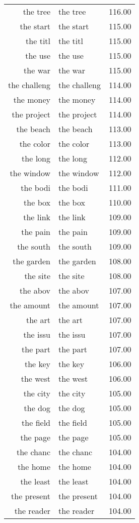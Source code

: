 \begin{table}[ht]
\begin{tabular}{rlr}
  the tree & the tree & 116.00 \\ 
  the start & the start & 115.00 \\ 
  the titl & the titl & 115.00 \\ 
  the use & the use & 115.00 \\ 
  the war & the war & 115.00 \\ 
  the challeng & the challeng & 114.00 \\ 
  the money & the money & 114.00 \\ 
  the project & the project & 114.00 \\ 
  the beach & the beach & 113.00 \\ 
  the color & the color & 113.00 \\ 
  the long & the long & 112.00 \\ 
  the window & the window & 112.00 \\ 
  the bodi & the bodi & 111.00 \\ 
  the box & the box & 110.00 \\ 
  the link & the link & 109.00 \\ 
  the pain & the pain & 109.00 \\ 
  the south & the south & 109.00 \\ 
  the garden & the garden & 108.00 \\ 
  the site & the site & 108.00 \\ 
  the abov & the abov & 107.00 \\ 
  the amount & the amount & 107.00 \\ 
  the art & the art & 107.00 \\ 
  the issu & the issu & 107.00 \\ 
  the part & the part & 107.00 \\ 
  the key & the key & 106.00 \\ 
  the west & the west & 106.00 \\ 
  the city & the city & 105.00 \\ 
  the dog & the dog & 105.00 \\ 
  the field & the field & 105.00 \\ 
  the page & the page & 105.00 \\ 
  the chanc & the chanc & 104.00 \\ 
  the home & the home & 104.00 \\ 
  the least & the least & 104.00 \\ 
  the present & the present & 104.00 \\ 
  the reader & the reader & 104.00 \\ 

\end{tabular}
\end{table}
